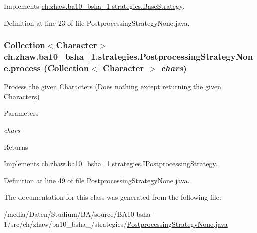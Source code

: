 Implements \hyperlink{classch_1_1zhaw_1_1ba10__bsha__1_1_1strategies_1_1BaseStrategy_a0496e8fd0099a5f0f7765322d7e752a9}{ch.zhaw.ba10\_\-bsha\_\-1.strategies.BaseStrategy}.

Definition at line 23 of file PostprocessingStrategyNone.java.\hypertarget{classch_1_1zhaw_1_1ba10__bsha__1_1_1strategies_1_1PostprocessingStrategyNone_af9183ec4f0802402cde7f97f746c7874}{
\subsubsection[{process}]{\setlength{\rightskip}{0pt plus 5cm}Collection$<${\bf Character}$>$ ch.zhaw.ba10\_\-bsha\_\-1.strategies.PostprocessingStrategyNone.process (Collection$<$ {\bf Character} $>$ {\em chars})}}
\label{classch_1_1zhaw_1_1ba10__bsha__1_1_1strategies_1_1PostprocessingStrategyNone_af9183ec4f0802402cde7f97f746c7874}
Process the given \hyperlink{classch_1_1zhaw_1_1ba10__bsha__1_1_1Character}{Character}s (Does nothing except returning the given \hyperlink{classch_1_1zhaw_1_1ba10__bsha__1_1_1Character}{Character}s)


\begin{DoxyParams}{Parameters}
\item[{\em chars}]\end{DoxyParams}
\begin{DoxyReturn}{Returns}

\end{DoxyReturn}


Implements \hyperlink{interfacech_1_1zhaw_1_1ba10__bsha__1_1_1strategies_1_1IPostprocessingStrategy_a0bb435d4c5cb8ce3b3909ad81961d912}{ch.zhaw.ba10\_\-bsha\_\-1.strategies.IPostprocessingStrategy}.

Definition at line 49 of file PostprocessingStrategyNone.java.

The documentation for this class was generated from the following file:\begin{DoxyCompactItemize}
\item 
/media/Daten/Studium/BA/source/BA10-\/bsha-\/1/src/ch/zhaw/ba10\_\-bsha\_/strategies/\hyperlink{PostprocessingStrategyNone_8java}{PostprocessingStrategyNone.java}\end{DoxyCompactItemize}
